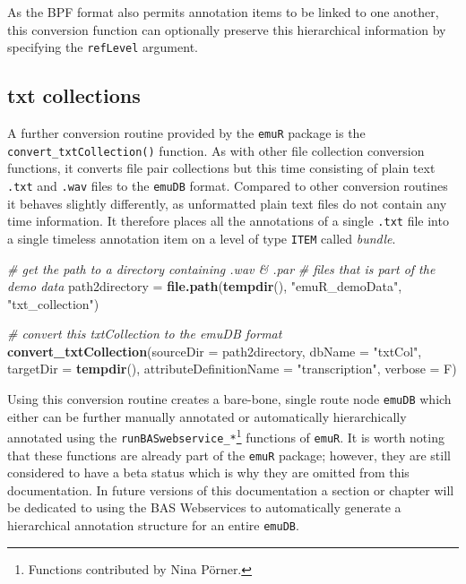 \documentclass[]{book}
\newenvironment{Shaded}{\begin{snugshade}}{\end{snugshade}}
\newcommand{\CommentTok}[1]{\textcolor[rgb]{0.56,0.35,0.01}{\textit{#1}}}
\newcommand{\DataTypeTok}[1]{\textcolor[rgb]{0.13,0.29,0.53}{#1}}
\newcommand{\KeywordTok}[1]{\textcolor[rgb]{0.13,0.29,0.53}{\textbf{#1}}}
\newcommand{\NormalTok}[1]{#1}
\newcommand{\StringTok}[1]{\textcolor[rgb]{0.31,0.60,0.02}{#1}}
\let\rmarkdownfootnote\footnote%
\def\footnote{\protect\rmarkdownfootnote}
\theoremstyle{definition}
\theoremstyle{definition}
\theoremstyle{definition}
\theoremstyle{remark}
\begin{document}
As the BPF format also permits annotation items to be linked to one
another, this conversion function can optionally preserve this
hierarchical information by specifying the \texttt{refLevel} argument.

\hypertarget{txt-collections}{%
\subsection{txt collections}\label{txt-collections}}

A further conversion routine provided by the \texttt{emuR} package is
the \texttt{convert\_txtCollection()} function. As with other file
collection conversion functions, it converts file pair collections but
this time consisting of plain text \texttt{.txt} and \texttt{.wav} files
to the \texttt{emuDB} format. Compared to other conversion routines it
behaves slightly differently, as unformatted plain text files do not
contain any time information. It therefore places all the annotations of
a single \texttt{.txt} file into a single timeless annotation item on a
level of type \texttt{ITEM} called \emph{bundle}.

\begin{Shaded}
\begin{Highlighting}[]
\CommentTok{# get the path to a directory containing .wav & .par}
\CommentTok{# files that is part of the demo data}
\NormalTok{path2directory =}\StringTok{ }\KeywordTok{file.path}\NormalTok{(}\KeywordTok{tempdir}\NormalTok{(),}
                           \StringTok{"emuR_demoData"}\NormalTok{,}
                           \StringTok{"txt_collection"}\NormalTok{)}

\CommentTok{# convert this txtCollection to the emuDB format}
\KeywordTok{convert_txtCollection}\NormalTok{(}\DataTypeTok{sourceDir =}\NormalTok{ path2directory,}
                      \DataTypeTok{dbName =} \StringTok{"txtCol"}\NormalTok{,}
                      \DataTypeTok{targetDir =} \KeywordTok{tempdir}\NormalTok{(),}
                      \DataTypeTok{attributeDefinitionName =} \StringTok{"transcription"}\NormalTok{,}
                      \DataTypeTok{verbose =}\NormalTok{ F)}
\end{Highlighting}
\end{Shaded}

Using this conversion routine creates a bare-bone, single route node
\texttt{emuDB} which either can be further manually annotated or
automatically hierarchically annotated using the
\texttt{runBASwebservice\_*}\footnote{Functions contributed by Nina
  Pörner.} functions of \texttt{emuR}. It is worth noting that these
functions are already part of the \texttt{emuR} package; however, they
are still considered to have a beta status which is why they are omitted
from this documentation. In future versions of this documentation a
section or chapter will be dedicated to using the BAS Webservices
\citep{kisler:2012a} to automatically generate a hierarchical annotation
structure for an entire \texttt{emuDB}.
\end{document}
